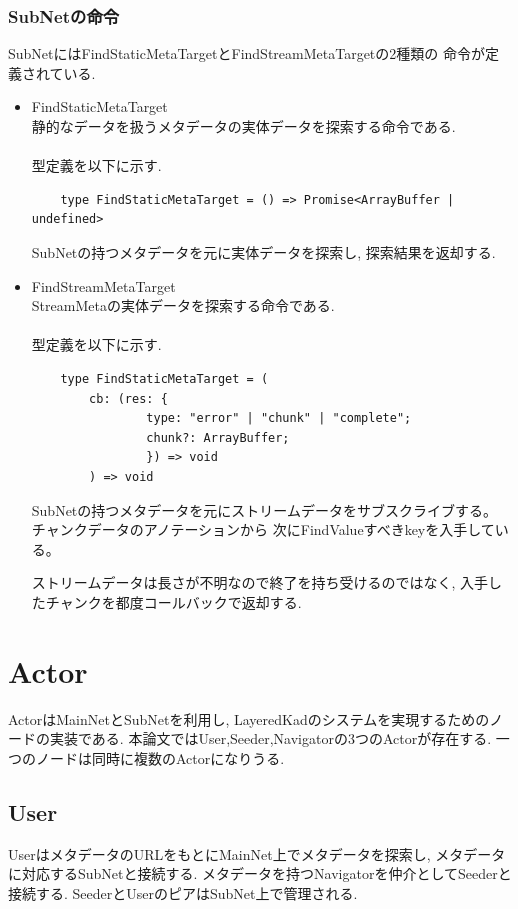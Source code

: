 \documentclass[sotsuron]{jcsie}
\begin{document}
\subsubsection{SubNetの命令}
SubNetにはFindStaticMetaTargetとFindStreamMetaTargetの2種類の
命令が定義されている.
\begin{itemize}
	\item {FindStaticMetaTarget}\\
	静的なデータを扱うメタデータの実体データを探索する命令である.
	\\\\
	型定義を以下に示す.
	\begin{lstlisting}
	type FindStaticMetaTarget = () => Promise<ArrayBuffer | undefined>
	\end{lstlisting}
	SubNetの持つメタデータを元に実体データを探索し,
	探索結果を返却する.
	\\
	\item {FindStreamMetaTarget}\\
	StreamMetaの実体データを探索する命令である.
	\\\\
	型定義を以下に示す.
	\begin{lstlisting}
	type FindStaticMetaTarget = (
		cb: (res: {
				type: "error" | "chunk" | "complete";
				chunk?: ArrayBuffer;
				}) => void
		) => void
	\end{lstlisting}
	SubNetの持つメタデータを元にストリームデータをサブスクライブする。
	チャンクデータのアノテーションから
	次にFindValueすべきkeyを入手している。
	
	ストリームデータは長さが不明なので終了を持ち受けるのではなく,
	入手したチャンクを都度コールバックで返却する.
\end{itemize}

\section{Actor}
ActorはMainNetとSubNetを利用し,
LayeredKadのシステムを実現するためのノードの実装である.
本論文ではUser,Seeder,Navigatorの3つのActorが存在する.
一つのノードは同時に複数のActorになりうる.

\subsection{User}
UserはメタデータのURLをもとにMainNet上でメタデータを探索し,
メタデータに対応するSubNetと接続する.
メタデータを持つNavigatorを仲介としてSeederと接続する.
SeederとUserのピアはSubNet上で管理される.
\end{document}
